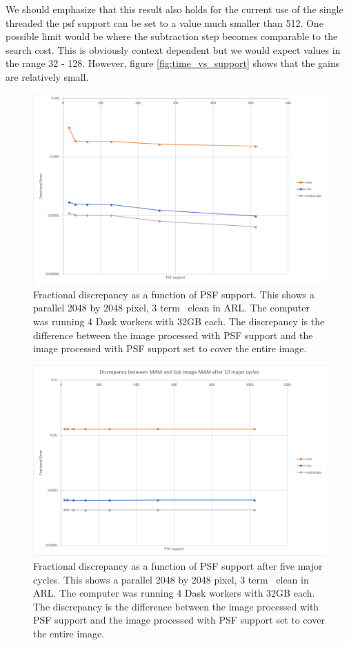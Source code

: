 \documentclass[11pt,a4paper,variablewidth]{article}
\begin{document}
We should emphasize that this result also holds for the current use of the single threaded \MAM\: the psf support can be set to a value much smaller than 512. One possible limit would be where the subtraction step becomes comparable to the search cost. This is obviously context dependent but we would expect values in the range 32 - 128. However, figure \ref{fig:time_vs_support} shows that the gains are relatively small.

\begin{figure}[H]
  \centering
  \includegraphics[width=\textwidth]{./pngs/error_versus_support.png}
  \caption{Fractional discrepancy as a function of PSF support. This shows a parallel 2048 by 2048 pixel, 3 term \MAM\ clean in ARL. The computer was running 4 Dask workers with 32GB each. The discrepancy is the difference between the image processed with PSF support and the image processed with PSF support set to cover the entire image.}
  \label{fig:error_vs_support}
\end{figure}

\begin{figure}[H]
  \centering
  \includegraphics[width=\textwidth]{./pngs/error_versus_support_ci.png}
  \caption{Fractional discrepancy as a function of PSF support after five major cycles. This shows a parallel 2048 by 2048 pixel, 3 term \MAM\ clean in ARL. The computer was running 4 Dask workers with 32GB each. The discrepancy is the difference between the image processed with PSF support and the image processed with PSF support set to cover the entire image.}
  \label{fig:error_vs_support_ci}
\end{figure}
\end{document}
